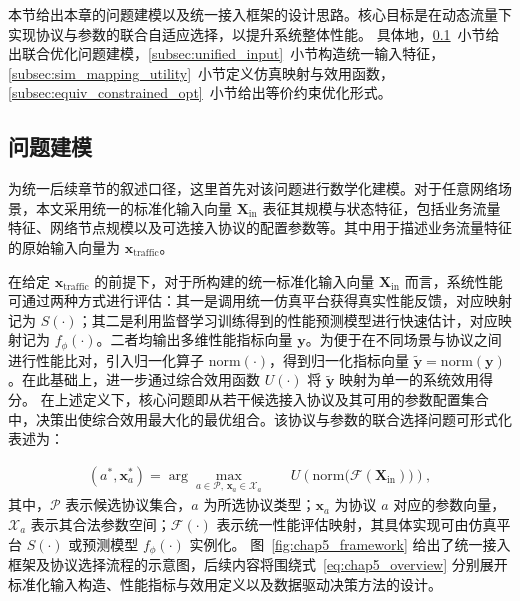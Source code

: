 本节给出本章的问题建模以及统一接入框架的设计思路。核心目标是在动态流量下实现协议与参数的联合自适应选择，以提升系统整体性能。
具体地，\ref{subsec:problem_formulation}~小节给出联合优化问题建模，\ref{subsec:unified_input}~小节构造统一输入特征，\ref{subsec:sim_mapping_utility}~小节定义仿真映射与效用函数，\ref{subsec:equiv_constrained_opt}~小节给出等价约束优化形式。



\subsection{问题建模}
\label{subsec:problem_formulation}

为统一后续章节的叙述口径，这里首先对该问题进行数学化建模。对于任意网络场景，本文采用统一的标准化输入向量 $\mathbf{X}_{\mathrm{in}}$ 表征其规模与状态特征，包括业务流量特征、网络节点规模以及可选接入协议的配置参数等。其中用于描述业务流量特征的原始输入向量为 $\mathbf{x}_{\mathrm{traffic}}$。

在给定 $\mathbf{x}_{\mathrm{traffic}}$ 的前提下，对于所构建的统一标准化输入向量 $\mathbf{X}_{\mathrm{in}}$ 而言，系统性能可通过两种方式进行评估：其一是调用统一仿真平台获得真实性能反馈，对应映射记为 $S(\cdot)$；其二是利用监督学习训练得到的性能预测模型进行快速估计，对应映射记为 $f_{\phi}(\cdot)$。二者均输出多维性能指标向量 $\mathbf{y}$。为便于在不同场景与协议之间进行性能比对，引入归一化算子 $\mathrm{norm}(\cdot)$，得到归一化指标向量 $\tilde{\mathbf{y}}=\mathrm{norm}(\mathbf{y})$。在此基础上，进一步通过综合效用函数 $U(\cdot)$ 将 $\tilde{\mathbf{y}}$ 映射为单一的系统效用得分。
在上述定义下，核心问题即从若干候选接入协议及其可用的参数配置集合中，决策出使综合效用最大化的最优组合。该协议与参数的联合选择问题可形式化表述为：

\begin{equation}
\label{eq:chap5_overview}
\begin{aligned}
(a^{*}, \mathbf{x}^{*}_{a})
=
\arg\max_{a \in \mathcal{P},\, \mathbf{x}_{a}\in\mathcal{X}_{a}}
\quad &
U\!\left(
\mathrm{norm}
\Big(
\mathcal{F}(\mathbf{X}_{\mathrm{in}})
\Big)
\right),
\end{aligned}
\end{equation}
其中，$\mathcal{P}$ 表示候选协议集合，$a$ 为所选协议类型；$\mathbf{x}_{a}$ 为协议 $a$ 对应的参数向量，$\mathcal{X}_{a}$ 表示其合法参数空间；$\mathcal{F}(\cdot)$ 表示统一性能评估映射，其具体实现可由仿真平台 $S(\cdot)$ 或预测模型 $f_{\phi}(\cdot)$ 实例化。
图~\ref{fig:chap5_framework} 给出了统一接入框架及协议选择流程的示意图，后续内容将围绕式~\eqref{eq:chap5_overview} 分别展开标准化输入构造、性能指标与效用定义以及数据驱动决策方法的设计。

